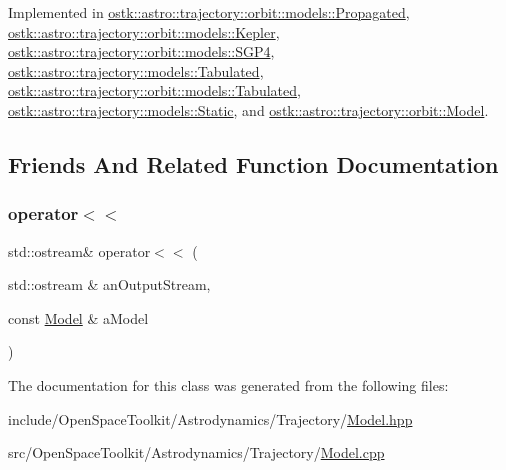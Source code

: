 Implemented in \hyperlink{classostk_1_1astro_1_1trajectory_1_1orbit_1_1models_1_1_propagated_a2b8aa6ff5511dbe92e6a3e7f4dd6880b}{ostk\+::astro\+::trajectory\+::orbit\+::models\+::\+Propagated}, \hyperlink{classostk_1_1astro_1_1trajectory_1_1orbit_1_1models_1_1_kepler_a9c71803234f356ade03453e3ae19ae94}{ostk\+::astro\+::trajectory\+::orbit\+::models\+::\+Kepler}, \hyperlink{classostk_1_1astro_1_1trajectory_1_1orbit_1_1models_1_1_s_g_p4_a12416476201382c3d1e3c620f7be106a}{ostk\+::astro\+::trajectory\+::orbit\+::models\+::\+S\+G\+P4}, \hyperlink{classostk_1_1astro_1_1trajectory_1_1models_1_1_tabulated_a330bfffa50eb77eb7f6d45cfec1e9e29}{ostk\+::astro\+::trajectory\+::models\+::\+Tabulated}, \hyperlink{classostk_1_1astro_1_1trajectory_1_1orbit_1_1models_1_1_tabulated_a66be3f1f23a464c666c38a3adcc3bab5}{ostk\+::astro\+::trajectory\+::orbit\+::models\+::\+Tabulated}, \hyperlink{classostk_1_1astro_1_1trajectory_1_1models_1_1_static_aae663f763324f081911ea47070c9f79f}{ostk\+::astro\+::trajectory\+::models\+::\+Static}, and \hyperlink{classostk_1_1astro_1_1trajectory_1_1orbit_1_1_model_a8ea45c1a6e51a6153ce3f72f5294f0c6}{ostk\+::astro\+::trajectory\+::orbit\+::\+Model}.



\subsection{Friends And Related Function Documentation}
\mbox{\label{classostk_1_1astro_1_1trajectory_1_1_model_a68240493d08f91f6613186eb52823e85}} 
\subsubsection{\texorpdfstring{operator$<$$<$}{operator<<}}
{\footnotesize\ttfamily std\+::ostream\& operator$<$$<$ (\begin{DoxyParamCaption}\item[{std\+::ostream \&}]{an\+Output\+Stream,  }\item[{const \hyperlink{classostk_1_1astro_1_1trajectory_1_1_model}{Model} \&}]{a\+Model }\end{DoxyParamCaption})\hspace{0.3cm}{\ttfamily [friend]}}



The documentation for this class was generated from the following files\+:\begin{DoxyCompactItemize}
\item 
include/\+Open\+Space\+Toolkit/\+Astrodynamics/\+Trajectory/\hyperlink{_model_8hpp}{Model.\+hpp}\item 
src/\+Open\+Space\+Toolkit/\+Astrodynamics/\+Trajectory/\hyperlink{_model_8cpp}{Model.\+cpp}\end{DoxyCompactItemize}
